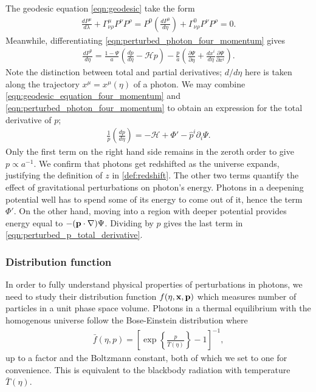 The geodesic equation \eqref{eqn:geodesic} take the form
\begin{align}
	\frac{dP^\mu}{d\lambda} + \Gamma^\mu_{\nu\rho} P^\nu P^\rho = P^0 \left( \frac{dP^0}{d\eta} \right) + \Gamma^0_{\nu\rho} P^\nu P^\rho = 0.  \label{eqn:geodesic_equation_four_momentum}
\end{align}
Meanwhile, differentiating \eqref{eqn:perturbed_photon_four_momentum} gives
\begin{align}
	\frac{dP^0}{d\eta} = \frac{1-\Psi}{a} \left( \frac{dp}{d\eta} - \mathcal{H}p \right) - \frac{p}{a} \left( \frac{\partial\Psi}{\partial\eta} + \frac{dx^i}{d\eta} \frac{\partial\Psi}{\partial x^i}  \right). \label{eqn:perturbed_energy_total_derivative}
\end{align}
Note the distinction between total and partial derivatives; $d/d\eta$ here is taken along the trajectory $x^\mu = x^\mu(\eta)$ of a photon. We may combine \eqref{eqn:geodesic_equation_four_momentum} and \eqref{eqn:perturbed_photon_four_momentum} to obtain an expression for the total derivative of $p$;
\begin{align}
	\frac{1}{p} \left( \frac{dp}{d\eta} \right) = - \mathcal{H} + \Phi' - \hat{p}^i \partial_i \Psi. \label{eqn:perturbed_p_total_derivative}
\end{align}
Only the first term on the right hand side remains in the zeroth order to give $p\propto a^{-1}$. We confirm that photons get redshifted as the universe expands, justifying the definition of $z$ in \eqref{def:redshift}. The other two terms quantify the effect of gravitational perturbations on photon's energy. Photons in a deepening potential well has to spend some of its energy to come out of it, hence the term $\Phi'$. On the other hand, moving into a region with deeper potential provides energy equal to $-({\mathbf{p}}\cdot\nabla)\Psi$. Dividing by $p$ gives the last term in \eqref{eqn:perturbed_p_total_derivative}.


\subsubsection*{Distribution function} \label{section:distribution_function}
In order to fully understand physical properties of perturbations in photons, we need to study their distribution function $f(\eta,\mathbf{x},\mathbf{p})$ which measures number of particles in a unit phase space volume. Photons in a thermal equilibrium with the homogenous universe follow the Bose-Einstein distribution where   
\begin{align}
	\bar{f}(\eta, p) = \left[ \exp \left\{ \frac{p}{\bar{T}(\eta)} \right\} - 1 \right]^{-1}, \label{eqn:photon_distribution_function}
\end{align}
up to a factor and the Boltzmann constant, both of which we set to one for convenience. This is equivalent to the blackbody radiation with temperature $\bar{T}(\eta)$.

